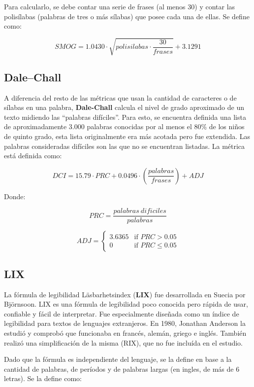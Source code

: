 \documentclass[12pt,journal,compsoc]{IEEEtran}
\begin{document}
Para calcularlo, se debe contar una serie de frases (al menos 30) y contar las polisílabas (palabras de tres o más sílabas) que posee cada una de ellas. Se define como: 

$$SMOG = 1.0430\cdot \sqrt{polisilabas \cdot \frac{30}{frases}} + 3.1291$$

\subsection{Dale–Chall}
A diferencia del resto de las métricas que usan la cantidad de caracteres o de sílabas en una palabra, \textbf{Dale-Chall}\cite{dale-chall} calcula el nivel de grado aproximado de un texto midiendo las ``palabras difíciles''. Para esto, se encuentra definida una lista de aproximadamente 3.000 palabras conocidas por al menos el 80\% de los niños de quinto grado, esta lista originalmente era más acotada pero fue extendida\cite{dale-chall-ex}. Las palabras consideradas difíciles son las que no se encuentran listadas. La métrica está definida como:

$$DCI = 15.79 \cdot PRC+0.0496\cdot \left({\frac{{palabras}}{{frases}}}\right) + ADJ$$

Donde:

$$ PRC = \frac{{palabras\ dificiles}}{{palabras}} $$

$$
ADJ =
\left\{
  \begin{array}{ll}
    3.6365 & \mbox{if } PRC > 0.05 \\
    0 & \mbox{if } PRC \leq 0.05
  \end{array}
\right.
$$

\subsection{LIX}

La fórmula de legibilidad Läsbarhetsindex (\textbf{LIX})\cite{lix-rix} fue desarrollada en Suecia por Björnsoon. LIX es una fórmula de legibilidad poco conocida pero rápida de usar, confiable y fácil de interpretar. Fue especialmente diseñada como un índice de legibilidad para textos de lenguajes extranjeros. En 1980, Jonathan Anderson la estudió y comprobó que funcionaba en francés, alemán, griego e inglés. También realizó una simplificación de la misma (RIX), que no fue incluída en el estudio.

Dado que la fórmula es independiente del lenguaje, se la define en base a la cantidad de palabras, de períodos y de palabras largas (en ingles, de más de 6 letras). Se la define como:
\end{document}
